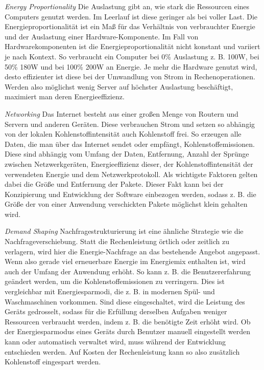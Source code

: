 \documentclass[utf8,biblatex]{lni}
\begin{document}
\textit{Energy Proportionality} \newline
Die Auslastung gibt an, wie stark die Ressourcen eines Computers genutzt werden. Im Leerlauf ist diese geringer als bei voller Last. Die Energieproportionalität ist ein Maß für das Verhältnis von verbrauchter Energie und der Auslastung einer Hardware-Komponente. Im Fall von Hardwarekomponenten ist die Energieproportionalität nicht konstant und variiert je nach Kontext. So verbraucht ein Computer bei 0\% Auslastung z. B. 100W, bei 50\% 180W und bei 100\% 200W an Energie. Je mehr die Hardware genutzt wird, desto effizienter ist diese bei der Umwandlung von Strom in Rechenoperationen. Werden also möglichst wenig Server auf höchster Auslastung beschäftigt, maximiert man deren Energieeffizienz.

\textit{Networking} \newline
Das Internet besteht aus einer großen Menge von Routern und Servern und anderen Geräten. Diese verbrauchen Strom und setzen so abhängig von der lokalen Kohlenstoffintensität auch Kohlenstoff frei. So erzeugen alle Daten, die man über das Internet sendet oder empfängt, Kohlenstoffemissionen. Diese sind abhängig vom Umfang der Daten, Entfernung, Anzahl der Sprünge zwischen Netzwerkgeräten, Energieeffizienz dieser, der Kohlenstoffintensität der verwendeten Energie und dem Netzwerkprotokoll. Als wichtigste Faktoren gelten dabei die Größe und Entfernung der Pakete. Dieser Fakt kann bei der Konzipierung und Entwicklung der Software einbezogen werden, sodass z. B. die Größe der von einer Anwendung verschickten Pakete möglichst klein gehalten wird. \cite{Principles21}

\textit{Demand Shaping} \newline
Nachfragestrukturierung ist eine ähnliche Strategie wie die Nachfrageverschiebung. Statt die Rechenleistung örtlich oder zeitlich zu verlagern, wird hier die Energie-Nachfrage an das bestehende Angebot angepasst. Wenn also gerade viel erneuerbare Energie im Energiemix enthalten ist, wird auch der Umfang der Anwendung erhöht. So kann z. B. die Benutzererfahrung geändert werden, um die Kohlenstoffemissionen zu verringern. Dies ist vergleichbar mit Energiesparmodi, die z. B. in modernen Spül- und Waschmaschinen vorkommen. Sind diese eingeschaltet, wird die Leistung des Geräts gedrosselt, sodass für die Erfüllung derselben Aufgaben weniger Ressourcen verbraucht werden, indem z. B. die benötigte Zeit erhöht wird. Ob der Energiesparmodus eines Geräts durch Benutzer manuell eingestellt werden kann oder automatisch verwaltet wird, muss während der Entwicklung entschieden werden. Auf Kosten der Rechenleistung kann so also zusätzlich Kohlenstoff eingespart werden.
\end{document}
